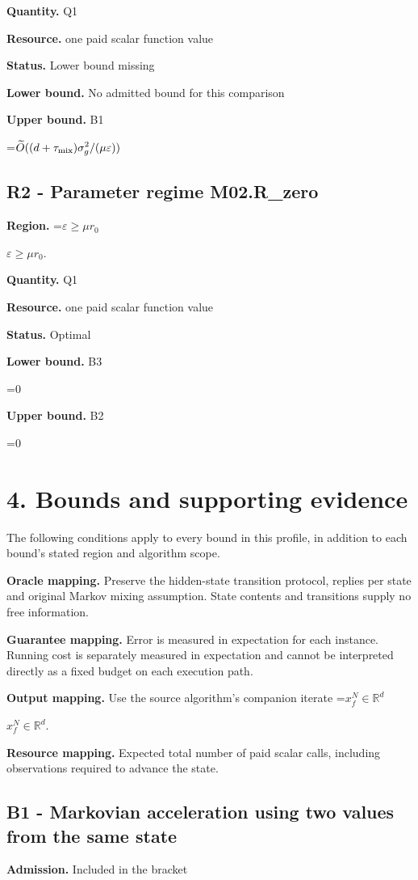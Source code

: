 \documentclass[10pt,a4paper]{article}
\newcommand{\AtlasMath}[1]{\par\begingroup\centering\setbox0=\hbox{$\displaystyle #1$}\ifdim\wd0>1.4\linewidth\typeout{ATLAS WIDE FORMULA: \the\wd0}\fi\ifdim\wd0>\linewidth\resizebox{\linewidth}{!}{\box0}\else\box0\fi\par\endgroup}
\newcommand{\AtlasInlineMath}[1]{\begingroup\setbox0=\hbox{$#1$}\ifdim\wd0>.4\linewidth\endgroup\AtlasMath{#1}\else\endgroup$#1$\fi}
\begin{document}
\textbf{Quantity.} Q1

\textbf{Resource.} one paid scalar function value

\textbf{Status.} Lower bound missing

\textbf{Lower bound.} No admitted bound for this comparison

\textbf{Upper bound.} B1

\AtlasMath{\widetilde{O}((d+\tau_{\rm mix})\sigma_g^2/(\mu\varepsilon))}
\subsection{R2 - Parameter regime M02.R\_zero}
\textbf{Region.} \AtlasInlineMath{\varepsilon\ge\mu r_0}.

\textbf{Quantity.} Q1

\textbf{Resource.} one paid scalar function value

\textbf{Status.} Optimal

\textbf{Lower bound.} B3

\AtlasMath{0}
\textbf{Upper bound.} B2

\AtlasMath{0}
\section{4. Bounds and supporting evidence}
The following conditions apply to every bound in this profile, in addition to each bound's stated region and algorithm scope.

\textbf{Oracle mapping.} Preserve the hidden-state transition protocol, replies per state and original Markov mixing assumption. State contents and transitions supply no free information.

\textbf{Guarantee mapping.} Error is measured in expectation for each instance. Running cost is separately measured in expectation and cannot be interpreted directly as a fixed budget on each execution path.

\textbf{Output mapping.} Use the source algorithm's companion iterate \AtlasInlineMath{x_f^N\in\mathbb{R}^d}.

\textbf{Resource mapping.} Expected total number of paid scalar calls, including observations required to advance the state.

\subsection{B1 - Markovian acceleration using two values from the same state}
\textbf{Admission.} Included in the bracket
\end{document}

